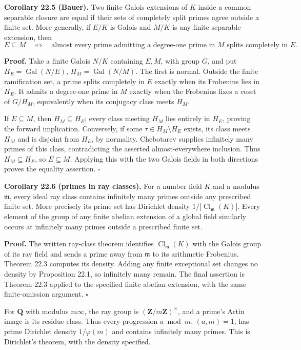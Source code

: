 \documentclass[11pt,a4paper]{article}
\begin{document}
\textbf{Corollary 22.5 (Bauer).} Two finite Galois extensions of \(K\)
inside a common separable closure are equal if their sets of completely
split primes agree outside a finite set. More generally, if \(E/K\) is
Galois and \(M/K\) is any finite separable extension, then \[
E\subseteq M
\quad\Longleftrightarrow\quad
\text{almost every prime admitting a degree-one prime in }M
\text{ splits completely in }E.
\tag{14}
\]

\textbf{Proof.} Take a finite Galois \(N/K\) containing \(E,M\), with
group \(G\), and put \(H_E=\operatorname{Gal}(N/E)\),
\(H_M=\operatorname{Gal}(N/M)\). The first is normal. Outside the finite
ramification set, a prime splits completely in \(E\) exactly when its
Frobenius lies in \(H_E\). It admits a degree-one prime in \(M\) exactly
when the Frobenius fixes a coset of \(G/H_M\), equivalently when its
conjugacy class meets \(H_M\).

If \(E\subseteq M\), then \(H_M\subseteq H_E\); every class meeting
\(H_M\) lies entirely in \(H_E\), proving the forward implication.
Conversely, if some \(\tau\in H_M\setminus H_E\) exists, its class meets
\(H_M\) and is disjoint from \(H_E\), by normality. Chebotarev supplies
infinitely many primes of this class, contradicting the asserted
almost-everywhere inclusion. Thus \(H_M\subseteq H_E\), so
\(E\subseteq M\). Applying this with the two Galois fields in both
directions proves the equality assertion. \(\square\)

\textbf{Corollary 22.6 (primes in ray classes).} For a number field
\(K\) and a modulus \(\mathfrak m\), every ideal ray class contains
infinitely many primes outside any prescribed finite set. More precisely
its prime set has Dirichlet density
\(1/|\operatorname{Cl}_{\mathfrak m}(K)|\). Every element of the group
of any finite abelian extension of a global field similarly occurs at
infinitely many primes outside a prescribed finite set.

\textbf{Proof.} The written ray-class theorem identifies
\(\operatorname{Cl}_{\mathfrak m}(K)\) with the Galois group of its ray
field and sends a prime away from \(\mathfrak m\) to its arithmetic
Frobenius. Theorem 22.3 computes its density. Adding any finite
exceptional set changes no density by Proposition 22.1, so infinitely
many remain. The final assertion is Theorem 22.3 applied to the
specified finite abelian extension, with the same finite-omission
argument. \(\square\)

For \(\mathbf Q\) with modulus \(m\infty\), the ray group is
\((\mathbf Z/m\mathbf Z)^\times\), and a prime's Artin image is its
residue class. Thus every progression \(a\bmod m\), \((a,m)=1\), has
prime Dirichlet density \(1/\varphi(m)\) and contains infinitely many
primes. This is Dirichlet's theorem, with the density specified.
\end{document}
